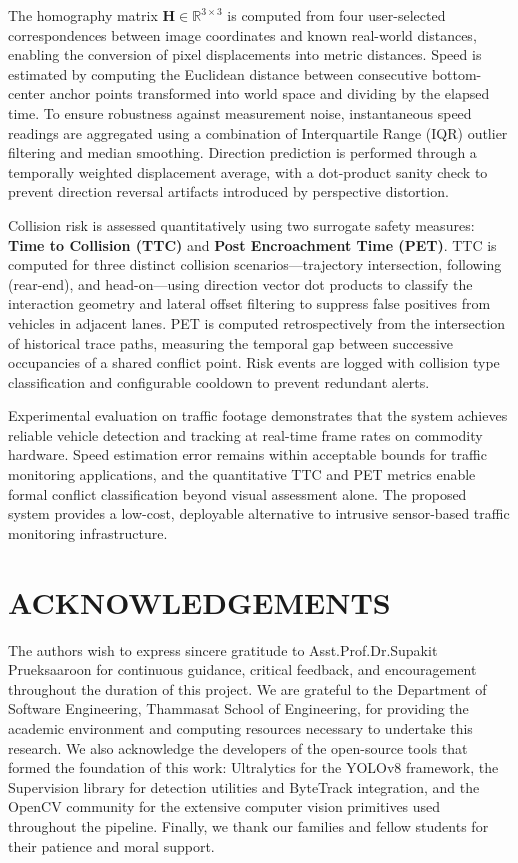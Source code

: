\documentclass[12pt]{report}
\begin{document}
The homography matrix $\mathbf{H} \in \mathbb{R}^{3 \times 3}$ is computed from four user-selected correspondences between image coordinates and known real-world distances, enabling the conversion of pixel displacements into metric distances.
Speed is estimated by computing the Euclidean distance between consecutive bottom-center anchor points transformed into world space and dividing by the elapsed time.
To ensure robustness against measurement noise, instantaneous speed readings are aggregated using a combination of Interquartile Range (IQR) outlier filtering and median smoothing.
Direction prediction is performed through a temporally weighted displacement average, with a dot-product sanity check to prevent direction reversal artifacts introduced by perspective distortion.

Collision risk is assessed quantitatively using two surrogate safety measures: \textbf{Time to Collision (TTC)} and \textbf{Post Encroachment Time (PET)}.
TTC is computed for three distinct collision scenarios---trajectory intersection, following (rear-end), and head-on---using direction vector dot products to classify the interaction geometry and lateral offset filtering to suppress false positives from vehicles in adjacent lanes.
PET is computed retrospectively from the intersection of historical trace paths, measuring the temporal gap between successive occupancies of a shared conflict point.
Risk events are logged with collision type classification and configurable cooldown to prevent redundant alerts.

Experimental evaluation on traffic footage demonstrates that the system achieves reliable vehicle detection and tracking at real-time frame rates on commodity hardware.
Speed estimation error remains within acceptable bounds for traffic monitoring applications, and the quantitative TTC and PET metrics enable formal conflict classification beyond visual assessment alone.
The proposed system provides a low-cost, deployable alternative to intrusive sensor-based traffic monitoring infrastructure.

\clearpage

\chapter*{ACKNOWLEDGEMENTS}

The authors wish to express sincere gratitude to Asst.Prof.Dr.Supakit Prueksaaroon for continuous guidance, critical feedback, and encouragement throughout the duration of this project.
We are grateful to the Department of Software Engineering, Thammasat School of Engineering, for providing the academic environment and computing resources necessary to undertake this research.
We also acknowledge the developers of the open-source tools that formed the foundation of this work: Ultralytics for the YOLOv8 framework, the Supervision library for detection utilities and ByteTrack integration, and the OpenCV community for the extensive computer vision primitives used throughout the pipeline.
Finally, we thank our families and fellow students for their patience and moral support.
\end{document}
